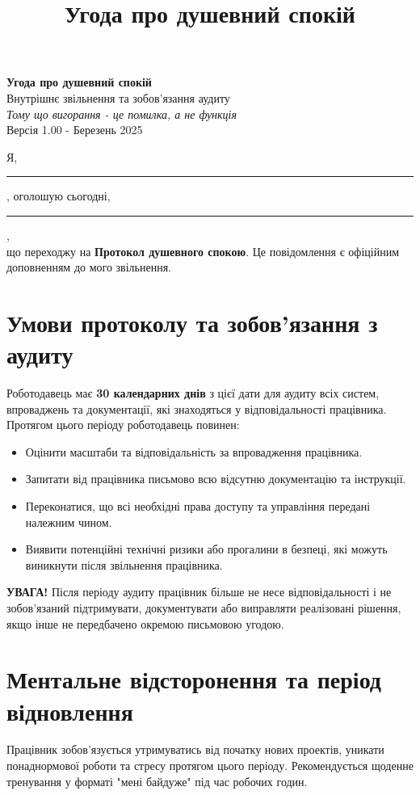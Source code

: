 \documentclass[a4paper,11pt]{article}
\title{Угода про душевний спокій}
\date{}
\begin{document}
\pagestyle{empty}

\begin{center}
    {\LARGE \textbf{Угода про душевний спокій}}\\[1em]
    {\large Внутрішнє звільнення та зобов'язання аудиту}\\[0.5em]
    \textit{Тому що вигорання - це помилка, а не функція}\\[0.5em]
    {\small Версія 1.00 - Березень 2025}
\end{center}

\vspace{2em}

Я, \rule{7cm}{0.2pt}, оголошую сьогодні, \rule{4cm}{0.2pt},\\
що переходжу на \textbf{Протокол душевного спокою}. Це повідомлення є офіційним доповненням до мого звільнення.

\section*{Умови протоколу та зобов'язання з аудиту}

Роботодавець має \textbf{30 календарних днів} з цієї дати для аудиту всіх систем, впроваджень та документації, які знаходяться у відповідальності працівника. Протягом цього періоду роботодавець повинен:

\begin{itemize}
    \item Оцінити масштаби та відповідальність за впровадження працівника.
    \item Запитати від працівника письмово всю відсутню документацію та інструкції.
    \item Переконатися, що всі необхідні права доступу та управління передані належним чином.
    \item Виявити потенційні технічні ризики або прогалини в безпеці, які можуть виникнути після звільнення працівника.
\end{itemize}

\textbf{УВАГА!} Після періоду аудиту працівник більше не несе відповідальності і не зобов'язаний підтримувати, документувати або виправляти реалізовані рішення, якщо інше не передбачено окремою письмовою угодою.

\section*{Ментальне відсторонення та період відновлення}

Працівник зобов'язується утримуватись від початку нових проектів, уникати понаднормової роботи та стресу протягом цього періоду. Рекомендується щоденне тренування у форматі "мені байдуже" під час робочих годин.
\end{document}
